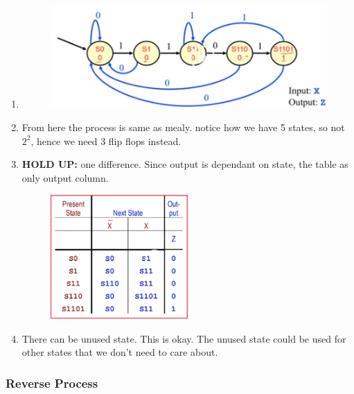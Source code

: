 \documentclass[11pt, a4paper]{article}
\begin{document}
\begin{enumerate}
    \item 
    \begin{figure}[H]
        \centering
        \includegraphics[width = \textwidth]{Pictures/FSM Ex2.png}
    \end{figure}
    \item From here the process is same as mealy. notice how we have 5 states, so not $2^{2}$, hence we need 3 flip flops instead.
    \item \textbf{HOLD UP:} one difference. Since output is dependant on state, the table as only output column.
    \begin{figure}[H]
        \centering
        \includegraphics[width = 0.5\textwidth]{Module 5/Notes/Pictures/FSM Ex2.1.png}
    \end{figure}
    \item There can be unused state. This is okay. The unused state could be used for other states that we don't need to care about.
\end{enumerate}

\subsubsection{Reverse Process}
\end{document}
